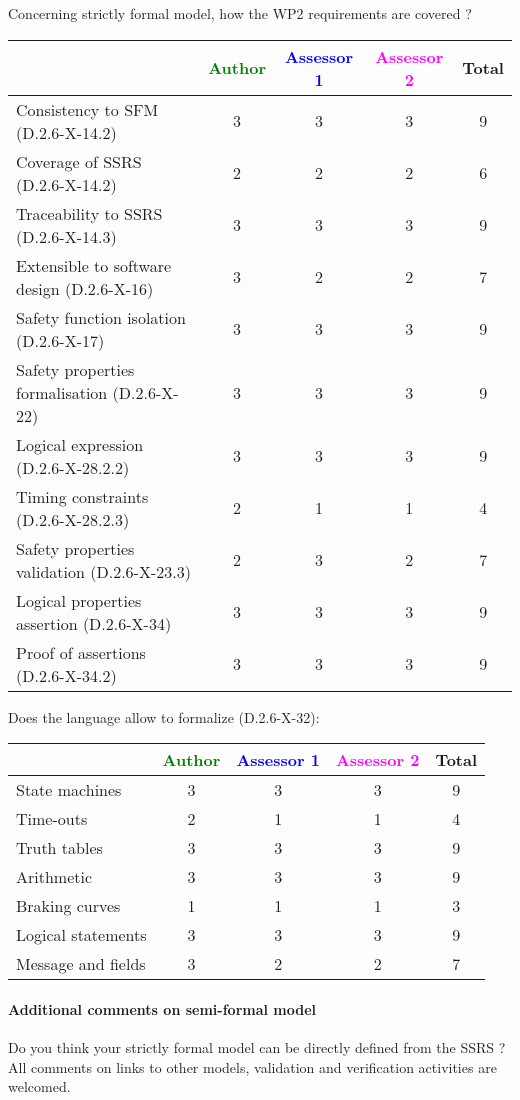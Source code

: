 Concerning strictly formal model, how the WP2 requirements are covered ?

\begin{tabular}{|l | c | c | c | c|}
\hline
& \textcolor{green}{Author} & \textcolor{blue}{Assessor 1} & \textcolor{magenta}{Assessor 2} & Total \\
\hline 
Consistency to SFM (D.2.6-X-14.2) & 3 & 3 & 3 & 9 \\
\hline
Coverage of SSRS (D.2.6-X-14.2)  & 2 & 2 & 2 & 6 \\
\hline
Traceability to  SSRS (D.2.6-X-14.3)  & 3 & 3 & 3 & 9 \\
\hline
Extensible to software design (D.2.6-X-16)  & 3 & 2 & 2 & 7 \\
\hline
Safety function isolation (D.2.6-X-17)  & 3 & 3 & 3 & 9 \\
\hline 
Safety properties formalisation (D.2.6-X-22)  & 3 & 3 & 3 & 9 \\
\hline
Logical expression (D.2.6-X-28.2.2)  & 3 & 3 & 3 & 9 \\
\hline
Timing constraints (D.2.6-X-28.2.3)  & 2 & 1 & 1 & 4 \\
\hline
Safety properties validation (D.2.6-X-23.3)  & 2 & 3 & 2 & 7 \\
\hline
Logical properties assertion (D.2.6-X-34)  & 3 & 3 & 3 & 9 \\
\hline
Proof of assertions (D.2.6-X-34.2)  & 3 & 3 & 3 & 9 \\
\hline
\end{tabular}

Does the language allow to  formalize (D.2.6-X-32):

\begin{tabular}{|l | c | c | c | c|}
\hline
& \textcolor{green}{Author} & \textcolor{blue}{Assessor 1} & \textcolor{magenta}{Assessor 2} & Total \\
\hline 
State machines  & 3 & 3 & 3 & 9 \\
\hline
Time-outs  & 2 & 1 & 1 & 4 \\
\hline
Truth tables  & 3 & 3 & 3 & 9 \\
\hline
Arithmetic  & 3 & 3 & 3 & 9 \\
\hline
Braking curves  & 1 & 1 & 1 & 3 \\
\hline
Logical statements & 3 & 3 & 3 & 9 \\
\hline
Message and fields & 3 & 2 & 2 & 7  \\
\hline
\end{tabular}

\paragraph{Additional comments on semi-formal  model} Do you think your strictly formal  model can be directly defined from the SSRS ?
All comments on links to  other models, validation and verification activities are welcomed.


